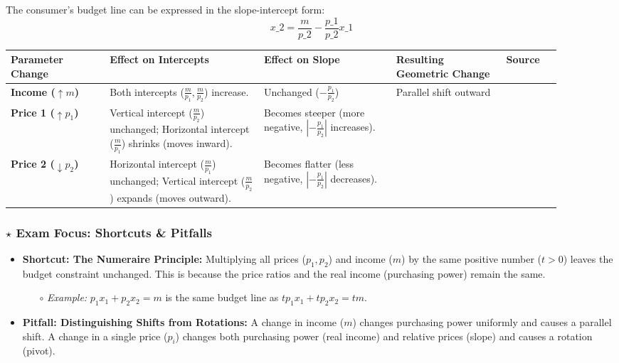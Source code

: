 \documentclass{article}
\begin{document}
The consumer's budget line can be expressed in the slope-intercept form: \[ x\_2 = \frac{m}{p\_2} - \frac{p\_1}{p\_2} x\_1 \]

\centering
\begin{tabular}{>{\raggedright\arraybackslash}p{0.18\linewidth} >{\raggedright\arraybackslash}p{0.28\linewidth} >{\raggedright\arraybackslash}p{0.24\linewidth} >{\raggedright\arraybackslash}p{0.20\linewidth} p{0cm}}
\toprule
\textbf{Parameter Change}& \textbf{Effect on Intercepts}& \textbf{Effect on Slope}& \textbf{Resulting Geometric Change}& \textbf{Source} \\
\midrule
\textbf{Income ($\uparrow m$)}&  Both intercepts ($\frac{m}{p_1}, \frac{m}{p_2}$) increase.& Unchanged ($-\frac{p_1}{p_2}$)& Parallel shift outward&   \\ \addlinespace
\textbf{Price 1 ($\uparrow p_1$)}&  Vertical intercept ($\frac{m}{p_2}$) unchanged; Horizontal intercept ($\frac{m}{p_1}$) shrinks (moves inward).& Becomes steeper (more negative, $| -\frac{p_1}{p_2}| $ increases). & & \\ \addlinespace
\textbf{Price 2 ($\downarrow p_2$)}&  Horizontal intercept ($\frac{m}{p_1}$) unchanged; Vertical intercept ($\frac{m}{p_2}$) expands (moves outward).& Becomes flatter (less negative, $| -\frac{p_1}{p_2}| $ decreases). & & \\
\bottomrule

\end{tabular}


\subsubsection*{$\star$ Exam Focus: Shortcuts \& Pitfalls}
\begin{itemize}
    \item \textbf{Shortcut: The Numeraire Principle:} Multiplying all prices ($p_1, p_2$) and income ($m$) by the same positive number ($t > 0$) leaves the budget constraint unchanged. This is because the price ratios and the real income (purchasing power) remain the same.
    \begin{itemize}
        \item[$\circ$] \textit{Example:} $p_1 x_1 + p_2 x_2 = m$ is the same budget line as $tp_1 x_1 + tp_2 x_2 = tm$.
    \end{itemize}
    \item \textbf{Pitfall: Distinguishing Shifts from Rotations:} A change in income ($m$) changes purchasing power uniformly and causes a parallel shift. A change in a single price ($p_i$) changes both purchasing power (real income) and relative prices (slope) and causes a rotation (pivot).
\end{itemize}
\end{document}
